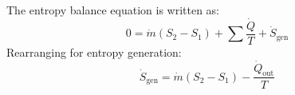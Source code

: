 The entropy balance equation is written as:  
\[
0 = \dot{m} (S_2 - S_1) + \sum \frac{\dot{Q}}{T} + \dot{S}_{\text{gen}}
\]  
Rearranging for entropy generation:  
\[
\dot{S}_{\text{gen}} = \dot{m} (S_2 - S_1) - \frac{\dot{Q}_{\text{out}}}{T}
\]